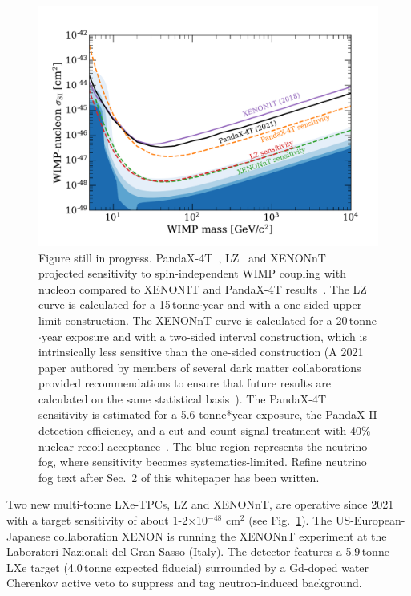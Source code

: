 \begin{figure}[!htbp]
\begin{center}
\includegraphics[width=0.99\columnwidth]{figures/xenon_CF1WP1_G2sens_v3.pdf}
\caption{{\color{red}Figure still in progress.} PandaX-4T~\cite{PandaX:2018wtu}, LZ~\cite{AKERIB201804} and XENONnT~\cite{XENON:2020kmp} projected sensitivity to spin-independent WIMP coupling with nucleon compared to XENON1T and PandaX-4T results~\cite{XENON:2018voc,PandaX-4T:2021bab}. The LZ curve is calculated for a 15\,tonne$\cdot$year and with a one-sided upper limit construction. The XENONnT curve is calculated for a 20\,tonne$\cdot$year exposure and with a two-sided interval construction, which is intrinsically less sensitive than the one-sided construction (A 2021 paper authored by members of several dark matter collaborations provided recommendations to ensure that future results are calculated on the same statistical basis~\cite{recommendation_dark_matter}). The PandaX-4T sensitivity is estimated for a 5.6 tonne*year exposure, the PandaX-II detection efficiency, and a cut-and-count signal treatment with 40\% nuclear recoil acceptance~\cite{PandaX:2018wtu}. The blue region represents the neutrino fog, where sensitivity becomes systematics-limited. {\color{red}Refine neutrino fog text after Sec.~2 of this whitepaper has been written.}}
\label{fig:xenon_sensi}
\end{center}
\end{figure}

Two new multi-tonne LXe-TPCs, LZ and XENONnT, are operative since 2021 with a target sensitivity of about 1-2$\times$10$^{-48}$ cm$^2$ (see Fig.~\ref{fig:xenon_sensi}).
The US-European-Japanese collaboration XENON is running the XENONnT experiment at the Laboratori Nazionali del Gran Sasso (Italy). The detector features a 5.9\,tonne LXe target (4.0\,tonne expected fiducial) surrounded by a Gd-doped water Cherenkov active veto to suppress and tag neutron-induced background.

